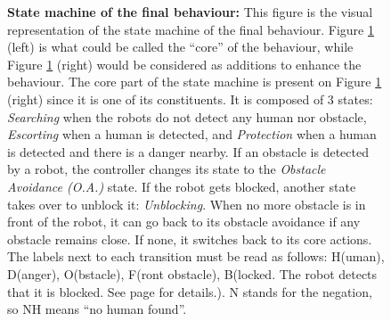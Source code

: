 \documentclass[oneside, a4paper, 12pt]{memoir}
\let\oldCaption\caption
\renewcommand{\caption}[2]{
\oldCaption[#1]{{\small\sffamily\bfseries #1:} #2}
}
\begin{document}
\begin{figure}[!htp]
		\caption{State machine of the final behaviour}{This figure is the visual representation of the state machine of the final behaviour. Figure \ref{fig:state_machine} (left) is what could be called the \enquote{core} of the behaviour, while Figure \ref{fig:state_machine} (right) would be considered as additions to enhance the behaviour. The core part of the state machine is present on Figure \ref{fig:state_machine} (right) since it is one of its constituents. It is composed of 3 states: \emph{Searching} when the robots do not detect any human nor obstacle, \emph{Escorting} when a human is detected, and \emph{Protection} when a human is detected and there is a danger nearby. If an obstacle is detected by a robot, the controller changes its state to the \emph{Obstacle Avoidance (O.A.)} state. If the robot gets blocked, another state takes over to unblock it: \emph{Unblocking}. When no more obstacle is in front of the robot, it can go back to its obstacle avoidance if any obstacle remains close. If none, it switches back to its core actions. The labels next to each transition must be read as follows: H(uman), D(anger), O(bstacle), F(ront obstacle), B(locked. The robot detects that it is blocked. See page \pageref{sec:unblocking} for details.). N stands for the negation, so NH means \enquote{no human found}.}
		\label{fig:state_machine}
	\end{figure}
	
\end{document}
